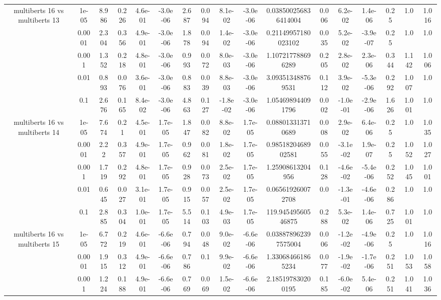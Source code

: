 \begin{tabular}{|c|c|c|c|c|c|c|c|c|c|c|c|c|c|c|c|c|}
\hline
\multirow{5}{*}{multiberts 16 vs multiberts 13} & 1e-05 & 8.986 & 0.226 & 4.6e-01 & -3.0e-06 & 2.687 & 0.094 & 8.1e-02 & -3.0e-06 & 0.038500256836414004 & 0.006 & 6.2e-02 & 1.4e-06 & 0.25 & 1.0 & 1.016 \\
 & 0.0001 & 2.304 & 0.356 & 4.9e-01 & -3.0e-06 & 1.878 & 0.094 & 1.4e-02 & -3.0e-06 & 0.21149957180023102 & 0.035 & 5.2e-02 & -3.9e-07 & 0.25 & 1.0 & 1.0 \\
 & 0.001 & 1.352 & 0.218 & 4.8e-01 & -3.0e-06 & 0.993 & 0.072 & 8.0e-03 & -3.0e-06 & 1.107217788696289 & 0.205 & 2.8e-02 & 2.3e-06 & 0.344 & 1.142 & 1.006 \\
 & 0.01 & 0.893 & 0.076 & 3.6e-01 & -3.0e-06 & 0.883 & 0.039 & 8.8e-03 & -3.0e-06 & 3.093513488769531 & 0.112 & 3.9e-02 & -5.3e-06 & 0.292 & 1.007 & 1.0 \\
 & 0.1 & 2.676 & 0.165 & 8.4e-02 & -3.0e-06 & 4.863 & 0.127 & -1.8e-02 & -3.0e-06 & 1.054698944091796 & 0.002 & -1.0e-01 & -2.9e-06 & 1.626 & 1.001 & 1.0 \\
\hline
\multirow{5}{*}{multiberts 16 vs multiberts 14} & 1e-05 & 7.674 & 0.21 & 4.5e-01 & 1.7e-05 & 1.847 & 0.082 & 8.8e-02 & 1.7e-05 & 0.088013313710689 & 0.008 & 2.9e-02 & 6.4e-06 & 0.25 & 1.0 & 1.035 \\
 & 0.0001 & 2.22 & 0.357 & 4.9e-01 & 1.7e-05 & 0.962 & 0.081 & 1.8e-02 & 1.7e-05 & 0.9851820468902581 & 0.055 & -3.1e-02 & 1.9e-07 & 0.25 & 1.052 & 1.027 \\
 & 0.001 & 1.719 & 0.292 & 4.8e-01 & 1.7e-05 & 0.928 & 0.073 & 2.5e-02 & 1.7e-05 & 1.25908613204956 & 0.128 & -4.6e-02 & -5.4e-06 & 0.252 & 1.045 & 1.001 \\
 & 0.01 & 0.645 & 0.027 & 3.1e-01 & 1.7e-05 & 0.915 & 0.057 & 2.5e-02 & 1.7e-05 & 0.065619260072708 & 0.0 & -1.3e-01 & -4.6e-06 & 0.286 & 1.0 & 1.0 \\
 & 0.1 & 2.885 & 0.304 & 1.0e-01 & 1.7e-05 & 5.514 & 0.103 & 4.9e-03 & 1.7e-05 & 119.94549560546875 & 0.288 & 5.3e-02 & 1.4e-06 & 0.725 & 1.001 & 1.0 \\
\hline
\multirow{5}{*}{multiberts 16 vs multiberts 15} & 1e-05 & 6.772 & 0.219 & 4.6e-01 & -6.6e-06 & 0.794 & 0.048 & 9.0e-02 & -6.6e-06 & 0.038878962397575004 & 0.006 & -1.2e-02 & -4.9e-06 & 0.25 & 1.0 & 1.016 \\
 & 0.0001 & 1.915 & 0.312 & 4.9e-01 & -6.6e-06 & 0.786 & 0.1 & 9.9e-02 & -6.6e-06 & 1.330684661865234 & 0.077 & -1.9e-02 & -1.7e-06 & 0.251 & 1.053 & 1.058 \\
 & 0.001 & 1.224 & 0.188 & 4.9e-01 & -6.6e-06 & 0.769 & 0.069 & 1.5e-02 & -6.6e-06 & 2.185197830200195 & 0.185 & -6.0e-02 & 5.4e-06 & 0.251 & 1.041 & 1.036 \\

\end{tabular}
